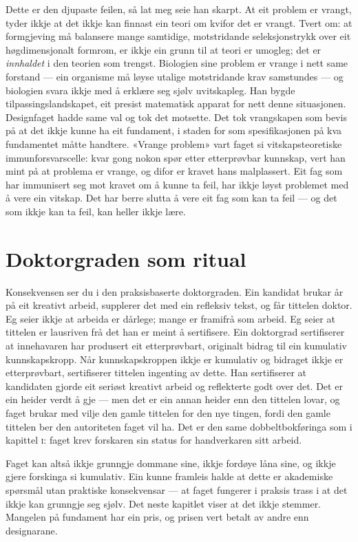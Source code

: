 Dette er den djupaste feilen, så lat meg seie han skarpt. At eit problem er vrangt, tyder ikkje at det ikkje kan finnast ein teori om kvifor det er vrangt. Tvert om: at formgjeving må balansere mange samtidige, motstridande seleksjonstrykk over eit høgdimensjonalt formrom, er ikkje ein grunn til at teori er umogleg; det er \emph{innhaldet} i den teorien som trengst. Biologien sine problem er vrange i nett same forstand — ein organisme må løyse utalige motstridande krav samstundes — og biologien svara ikkje med å erklære seg sjølv uvitskapleg. Han bygde tilpassingslandskapet, eit presist matematisk apparat for nett denne situasjonen. Designfaget hadde same val og tok det motsette. Det tok vrangskapen som bevis på at det ikkje kunne ha eit fundament, i staden for som spesifikasjonen på kva fundamentet måtte handtere. «Vrange problem» vart faget si vitskapsteoretiske immunforsvarscelle: kvar gong nokon spør etter etterprøvbar kunnskap, vert han mint på at problema er vrange, og difor er kravet hans malplassert. Eit fag som har immunisert seg mot kravet om å kunne ta feil, har ikkje løyst problemet med å vere ein vitskap. Det har berre slutta å vere eit fag som kan ta feil — og det som ikkje kan ta feil, kan heller ikkje lære.

\section{Doktorgraden som ritual}

Konsekvensen ser du i den praksisbaserte doktorgraden. Ein kandidat brukar år på eit kreativt arbeid, supplerer det med ein refleksiv tekst, og får tittelen doktor. Eg seier ikkje at arbeida er dårlege; mange er framifrå som arbeid. Eg seier at tittelen er lausriven frå det han er meint å sertifisere. Ein doktorgrad sertifiserer at innehavaren har produsert eit etterprøvbart, originalt bidrag til ein kumulativ kunnskapskropp. Når kunnskapskroppen ikkje er kumulativ og bidraget ikkje er etterprøvbart, sertifiserer tittelen ingenting av dette. Han sertifiserer at kandidaten gjorde eit seriøst kreativt arbeid og reflekterte godt over det. Det er ein heider verdt å gje — men det er ein annan heider enn den tittelen lovar, og faget brukar med vilje den gamle tittelen for den nye tingen, fordi den gamle tittelen ber den autoriteten faget vil ha. Det er den same dobbeltbokføringa som i kapittel \textsc{i}: faget krev forskaren sin status for handverkaren sitt arbeid.

\vignett

Faget kan altså ikkje grunngje dommane sine, ikkje fordøye låna sine, og ikkje gjere forskinga si kumulativ. Ein kunne framleis halde at dette er akademiske spørsmål utan praktiske konsekvensar — at faget fungerer i praksis trass i at det ikkje kan grunngje seg sjølv. Det neste kapitlet viser at det ikkje stemmer. Mangelen på fundament har ein pris, og prisen vert betalt av andre enn designarane.
